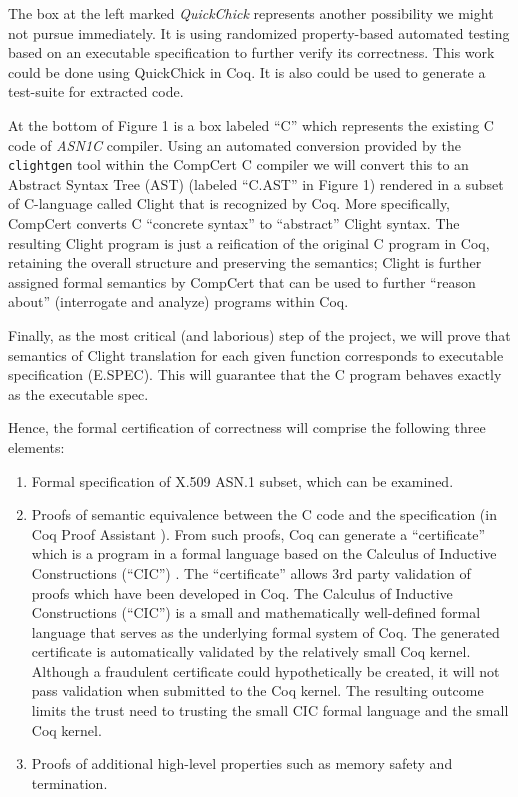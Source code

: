 \documentclass[acmsmall,nonacm]{acmart}
\begin{document}
The box at the left marked \textit{QuickChick} represents another
possibility we might not pursue immediately. It is using randomized
property-based automated testing based on an executable
specification to further verify its correctness. This work could be
done using QuickChick \cite{QuickChick} in Coq. It is also could be used
to generate a test-suite for extracted code.

At the bottom of Figure 1 is a box labeled ``C'' which represents the
existing C code of \emph{ASN1C} compiler. Using an automated conversion
provided by the \texttt{clightgen} tool within the CompCert C compiler
\cite{CompCert} we will convert this to an Abstract Syntax Tree (AST)
\cite{AST} (labeled ``C.AST'' in Figure 1) rendered in a subset
of C-language called Clight \cite{Mechanized} that is recognized by Coq. More specifically,
CompCert converts C ``concrete syntax'' to ``abstract'' Clight
syntax. The resulting Clight program is just a reification of the
original C program in Coq, retaining the overall structure and
preserving the semantics; Clight is further assigned formal semantics
by CompCert that can be used to further ``reason about'' (interrogate
and analyze) programs within Coq.

Finally, as the most critical (and laborious) step of the project, we
will prove that semantics of Clight
translation for each given function corresponds to executable
specification (E.SPEC). This will guarantee that the C program behaves exactly
as the executable spec.

Hence, the formal certification of correctness will comprise the following
three elements:

\begin{enumerate}[label=(\alph*)]

\item Formal specification of X.509 ASN.1 subset, which can be examined.

\item Proofs of semantic equivalence between the C code and the
  specification (in Coq Proof Assistant \cite{Coq}). From such
  proofs, Coq can generate a ``certificate'' which is a program in a
  formal language based on the Calculus of Inductive Constructions
  (``CIC'') \cite{CIC}. The ``certificate'' allows 3rd party
  validation of proofs which have been developed in Coq. The Calculus
  of Inductive Constructions (``CIC'') is a small and mathematically
  well-defined formal language that serves as the underlying formal
  system of Coq. The generated certificate is automatically validated
  by the relatively small Coq kernel. Although a fraudulent
  certificate could hypothetically be created, it will not pass
  validation when submitted to the Coq kernel. The resulting outcome
  limits the trust need to trusting the small CIC formal language and
  the small Coq kernel.

\item Proofs of additional high-level properties such as memory safety
  and termination.

\end{enumerate}
  
\end{document}
